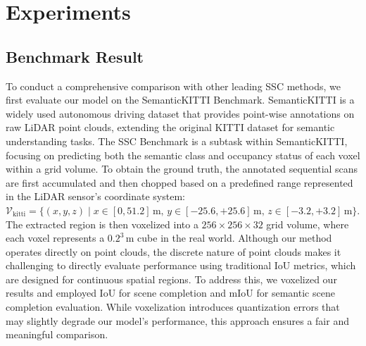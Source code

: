 \documentclass[conference]{IEEEtran}
\begin{document}
\section{Experiments}

\subsection{Benchmark Result}

To conduct a comprehensive comparison with other leading SSC methods, we first evaluate our model on the SemanticKITTI \cite{jbehley2011} Benchmark.
SemanticKITTI is a widely used autonomous driving dataset that provides point-wise annotations on raw LiDAR point clouds, extending the original KITTI dataset for semantic understanding tasks.
The SSC Benchmark is a subtask within SemanticKITTI, focusing on predicting both the semantic class and occupancy status of each voxel within a grid volume.
To obtain the ground truth, the annotated sequential scans are first accumulated and then chopped based on a predefined range represented in the LiDAR sensor's coordinate system:
$\mathcal{V}_\mathrm{kitti} = \{(x,y,z) \mid x \in [0, 51.2]\,\text{m},\, y \in [-25.6, +25.6]\,\text{m},\, z \in [-3.2, +3.2]\,\text{m}\}$.
The extracted region is then voxelized into a $256 \times 256 \times 32$ grid volume, where each voxel represents a $0.2^3$\,m cube in the real world.
Although our method operates directly on point clouds, the discrete nature of point clouds makes it challenging to directly evaluate performance using traditional IoU metrics, which are designed for continuous spatial regions.
To address this, we voxelized our results and employed IoU for scene completion and mIoU for semantic scene completion evaluation.
While voxelization introduces quantization errors that may slightly degrade our model's performance, this approach ensures a fair and meaningful comparison.
\end{document}
